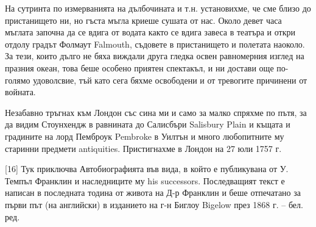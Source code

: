 \documentclass[12pt]{book}
\begin{document}
На сутринта по измерванията на дълбочината и т.н. установихме, че сме близо до пристанището ни, но гъста мъгла криеше сушата от нас. Около девет часа мъглата започна да се вдига от водата както се вдига завеса в театъра и откри отдолу градът Фолмаут Falmouth, съдовете в пристанището и полетата наоколо. За тези, които дълго не бяха виждали друга гледка освен равномерния изглед на празния океан, това беше особено приятен спектакъл, и ни достави още по-голямо удоволсвие, тъй като сега бяхме освободени и от тревогите причинени от войната.

Незабавно тръгнах към Лондон със сина ми и само за малко спряхме по пътя, за да видим Стоунхендж в равнината до Салисбъри Salisbury Plain и къщата и градините на лорд Пемброук Pembroke в Уилтън и много любопитните му старинни предмети antiquities. Пристигнахме в Лондон на 27 юли 1757 г.

     [16] Тук приключва Автобиографията във вида, в който е публикувана от У. Темпъл Франклин и наследниците му his successors. Последващият текст е написан в последната тодина от живота на Д-р Франклин и беше отпечатано за първи път (на английски) в изданието на г-н Биглоу Bigelow през 1868 г. – бел. ред.
\end{document}

